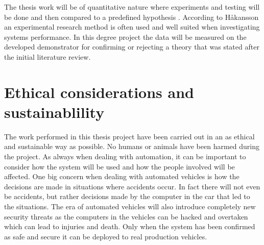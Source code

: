 The thesis work will be of quantitative nature where experiments and testing will be done and then compared to a predefined hypothesis \cite{haakansson2013portal}. According to Håkansson \cite{haakansson2013portal} an experimental research method is often used and well suited when investigating systems performance. In this degree project the data will be measured on the developed demonstrator for confirming or rejecting a theory that was stated after the initial literature review.

\section{Ethical considerations and sustainablility}
The work performed in this thesis project have been carried out in an as ethical and sustainable way as possible. No humans or animals have been harmed during the project. As always when dealing with automation, it can be important to consider how the system will be used and how the people involved will be affected. One big concern when dealing with automated vehicles is how the decisions are made in situations where accidents occur. In fact there will not even be accidents, but rather decisions made by the computer in the car that led to the situations. The era of automated vehicles will also introduce completely new security threats as the computers in the vehicles can be hacked and overtaken which can lead to injuries and death. Only when the system has been confirmed as safe and secure it can be deployed to real production vehicles.